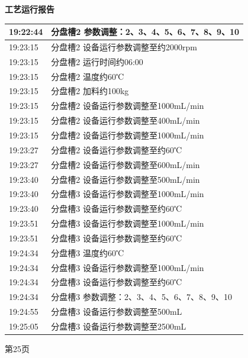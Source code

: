 \documentclass[UTF8,10pt,a4paper,fontset=fandol]{ctexart}
\begin{document}
\newpage

\noindent
\begin{minipage}[t]{0.48\linewidth}
\centering
\textbf{工艺运行报告}

\smallskip
\begin{tabular}{|p{1.25cm}|p{5.35cm}|}
\hline
19:22:44 & 分盘槽2 参数调整：2、3、4、5、6、7、8、9、10 \\ \hline
19:23:15 & 分盘槽2 设备运行参数调整至约2000rpm \\ \hline
19:23:15 & 分盘槽2 运行时间约06:00 \\ \hline
19:23:15 & 分盘槽2 温度约60℃ \\ \hline
19:23:15 & 分盘槽2 加料约100kg \\ \hline
19:23:15 & 分盘槽2 设备运行参数调整至1000mL/min \\ \hline
19:23:15 & 分盘槽2 设备运行参数调整至400mL/min \\ \hline
19:23:15 & 分盘槽2 设备运行参数调整至1000mL/min \\ \hline
19:23:27 & 分盘槽2 设备运行参数调整至约60℃ \\ \hline
19:23:27 & 分盘槽2 设备运行参数调整至600mL/min \\ \hline
19:23:40 & 分盘槽2 设备运行参数调整至500mL/min \\ \hline
19:23:40 & 分盘槽3 设备运行参数调整至1000mL/min \\ \hline
19:23:40 & 分盘槽3 设备运行参数调整至约60℃ \\ \hline
19:23:51 & 分盘槽3 设备运行参数调整至1000mL/min \\ \hline
19:23:51 & 分盘槽3 设备运行参数调整至约60℃ \\ \hline
19:24:34 & 分盘槽3 温度约60℃ \\ \hline
19:24:34 & 分盘槽3 设备运行参数调整至1000mL/min \\ \hline
19:24:34 & 分盘槽3 设备运行参数调整至约60℃ \\ \hline
19:24:34 & 分盘槽3 参数调整：2、3、4、5、6、7、8、9、10 \\ \hline
19:24:55 & 分盘槽3 设备运行参数调整至500mL \\ \hline
19:25:05 & 分盘槽3 设备运行参数调整至2500mL \\ \hline
\end{tabular}

\medskip
第25页
\end{minipage}
\hfill
\end{document}

